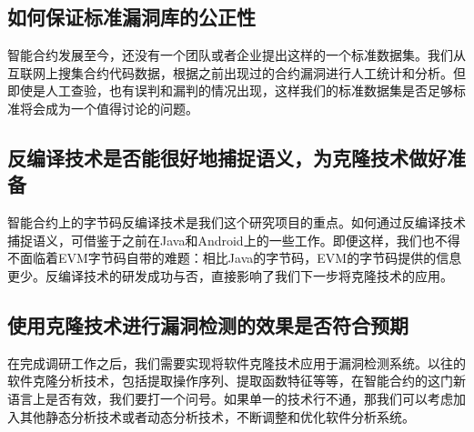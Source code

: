 \subsection{如何保证标准漏洞库的公正性}

智能合约发展至今，还没有一个团队或者企业提出这样的一个标准数据集。我们从互联网上搜集合约代码数据，根据之前出现过的合约漏洞进行人工统计和分析。但即使是人工查验，也有误判和漏判的情况出现，这样我们的标准数据集是否足够标准将会成为一个值得讨论的问题。

\subsection{反编译技术是否能很好地捕捉语义，为克隆技术做好准备}

智能合约上的字节码反编译技术是我们这个研究项目的重点。如何通过反编译技术捕捉语义，可借鉴于之前在Java和Android上的一些工作。即便这样，我们也不得不面临着EVM字节码自带的难题：相比Java的字节码，EVM的字节码提供的信息更少。反编译技术的研发成功与否，直接影响了我们下一步将克隆技术的应用。

\subsection{使用克隆技术进行漏洞检测的效果是否符合预期}

在完成调研工作之后，我们需要实现将软件克隆技术应用于漏洞检测系统。以往的软件克隆分析技术，包括提取操作序列、提取函数特征等等，在智能合约的这门新语言上是否有效，我们要打一个问号。如果单一的技术行不通，那我们可以考虑加入其他静态分析技术或者动态分析技术，不断调整和优化软件分析系统。